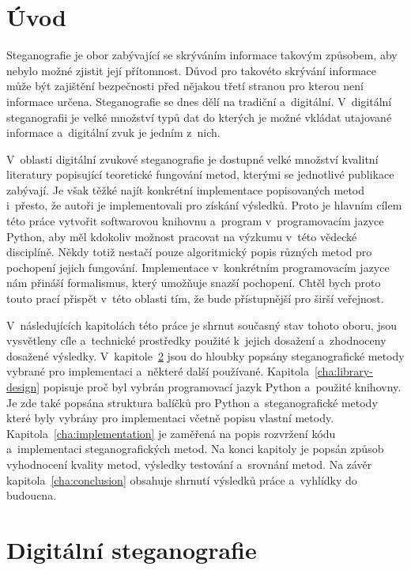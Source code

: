 \chapter{Úvod}
\label{cha:introduction}

Steganografie je obor zabývající se skrýváním informace takovým způsobem, aby
nebylo možné zjistit její přítomnost. Důvod pro takovéto skrývání informace
může být zajištění bezpečnosti před nějakou třetí stranou pro kterou není
informace určena. Steganografie se dnes dělí na tradiční a~digitální.
V~digitální steganografii je velké množství typů dat do kterých je možné
vkládat utajované informace a~digitální zvuk je jedním z~nich.

V~oblasti digitální zvukové steganografie je dostupné velké množství kvalitní
literatury popisující teoretické fungování metod, kterými se jednotlivé
publikace zabývají. Je však těžké najít konkrétní implementace popisovaných
metod i~přesto, že autoři je implementovali pro získání výsledků. Proto je
hlavním cílem této práce vytvořit softwarovou knihovnu a~program
v~programovacím jazyce Python, aby měl kdokoliv možnost pracovat na výzkumu
v~této vědecké disciplíně. Někdy totiž nestačí pouze algoritmický popis různých
metod pro pochopení jejich fungování. Implementace v~konkrétním programovacím
jazyce nám přináší formalismus, který umožňuje snazší pochopení. Chtěl bych
proto touto prací přispět v~této oblasti tím, že bude přístupnější pro širší
veřejnost.

V~následujících kapitolách této práce je shrnut současný stav tohoto oboru,
jsou vysvětleny cíle a~technické prostředky použité k~jejich dosažení
a~zhodnoceny dosažené výsledky. V~kapitole~\ref{cha:digital-steganography}
 jsou do hloubky popsány steganografické metody vybrané pro
implementaci a~některé další používané. Kapitola~\ref{cha:library-design}
popisuje proč byl vybrán programovací jazyk Python a~použité knihovny. Je zde
také popsána struktura balíčků pro Python a~steganografické metody které byly
vybrány pro implementaci včetně popisu vlastní metody.
Kapitola~\ref{cha:implementation} je zaměřená na popis rozvržení kódu
a~implementaci steganografických metod. Na konci kapitoly je popsán způsob
vyhodnocení kvality metod, výsledky testování a~srovnání metod. Na závěr
kapitola~\ref{cha:conclusion} obsahuje shrnutí výsledků práce a~vyhlídky do
budoucna.


\chapter{Digitální steganografie}
\label{cha:digital-steganography}

